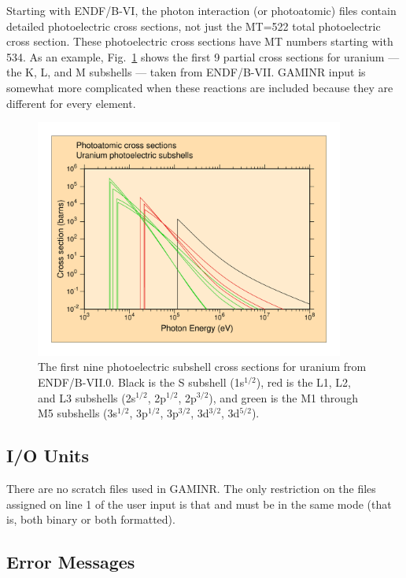 Starting with ENDF/B-VI, the photon interaction (or photoatomic)
files contain detailed photoelectric cross sections, not just
the MT=522 total photoelectric cross section.  These photoelectric
cross sections have MT numbers starting with 534.  As an example,
Fig.~\ref{shells} shows the first 9 partial cross sections for
uranium --- the K, L, and M subshells --- taken from ENDF/B-VII.
GAMINR input is somewhat more complicated when these reactions
are included because they are different for every element.

\begin{figure}[thb]\centering
\includegraphics[keepaspectratio, width=4.0in,angle=0]{figs/gaminr4ack}
\caption[ENDF/B-VII.0 Uranium photoelectric subshell cross sections]{The
 first nine photoelectric subshell cross sections for uranium from
 ENDF/B-VII.0.  Black is the S subshell (1s$^{1/2}$), red is the L1, L2,
 and L3 subshells (2s$^{1/2}$, 2p$^{1/2}$, 2p$^{3/2}$), and green is the
 M1 through M5 subshells (3s$^{1/2}$, 3p$^{1/2}$, 3p$^{3/2}$, 3d$^{3/2}$,
 3d$^{5/2}$).}
\label{shells}
\end{figure}

\subsection{I/O Units}
\label{ssGAMINR_IO}

There are no scratch files used in GAMINR.  The only restriction
on the files assigned on line 1 of the user input is that  and
 must be in the same mode (that is, both binary or both
formatted).

\subsection{Error Messages}

